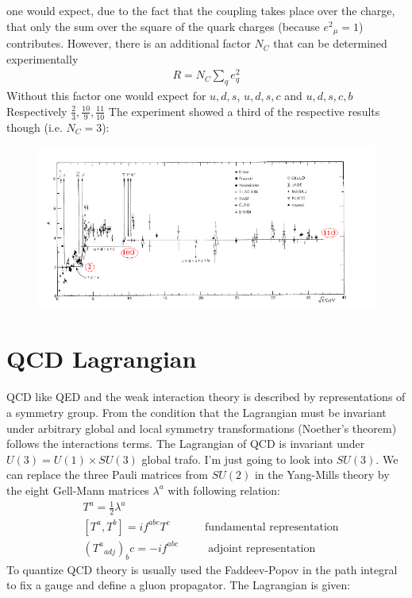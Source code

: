 one would expect, due to the fact that the coupling takes place over the charge, that only the sum over the square of the quark charges (because $  {e^2}_\mu= 1$) contributes. However, there is an additional factor $N_C$ that can be determined experimentally
\begin{equation}
\begin{split}
R = N_C \sum_q e^2_q
\end{split}
\end{equation}
Without this factor one would expect for $ u, d, s $, $ u, d, s, c $ and $ u, d, s, c, b $ Respectively $ \frac{2}{3}, \frac{10}{9}, \frac{11}{10} $ The experiment showed a third of the respective results though (i.e. $ N_C =3 $):

\begin{figure}[h!]
\centering
\includegraphics[scale=0.6]{images/Intro/Ratio.png}
\cite{Eva}
\end{figure}
\pagebreak
\section{QCD Lagrangian}

QCD like QED and the weak interaction theory is described by representations of a symmetry group. From the condition that the Lagrangian must be invariant under arbitrary global and local symmetry transformations (Noether’s theorem) follows the interactions terms.
The Lagrangian of QCD is invariant under $ U(3) = U(1) \times SU(3) $ global trafo. I'm just going to look into $ SU(3) $. We can replace the three Pauli matrices from $ SU(2) $ in the Yang-Mills theory by the eight Gell-Mann matrices $ {\lambda}^a $ with following relation:
\begin{equation}
\begin{split}
&T^a = \frac{1}{2} \lambda^a\\
&[T^a, T^b]= if^{abc} T^c \:\:\:\:\:\:\:\:\:\:\:\:\:\:\text{fundamental representation}\\
&({T^a}_{adj})_bc = -if^{abc} \:\:\:\:\:\:\:\:\:\:\:\:\text{adjoint representation}
\end{split}
\end{equation}
To quantize QCD theory is usually used the Faddeev-Popov in the path integral to fix a gauge and define a gluon propagator. The Lagrangian is given:

